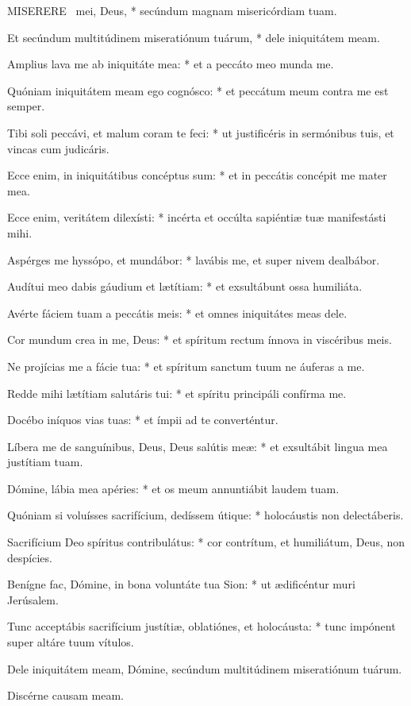 \lettrine[lines=2]{M}{ISERERE} \textdagger\ mei, Deus, * secúndum magnam misericórdiam tuam.

Et secúndum multitúdinem miseratiónum tuárum, * dele iniquitátem meam.

Amplius lava me ab iniquitáte mea: * et a peccáto meo munda me.

Quóniam iniquitátem meam ego cognósco: * et peccátum meum contra me est semper.

Tibi soli peccávi, et malum coram te feci: * ut justificéris in sermónibus tuis, et vincas cum judicáris.

Ecce enim, in iniquitátibus concéptus sum: * et in peccátis concépit me mater mea.

Ecce enim, veritátem dilexísti: * incérta et occúlta sapiéntiæ tuæ manifestásti mihi.

Aspérges me hyssópo, et mundábor: * lavábis me, et super nivem dealbábor.

Audítui meo dabis gáudium et lætítiam: * et exsultábunt ossa humiliáta.

Avérte fáciem tuam a peccátis meis: * et omnes iniquitátes meas dele.

Cor mundum crea in me, Deus: * et spíritum rectum ínnova in viscéribus meis.

Ne projícias me a fácie tua: * et spíritum sanctum tuum ne áuferas a me.

Redde mihi lætítiam salutáris tui: * et spíritu principáli confírma me.

Docébo iníquos vias tuas: * et ímpii ad te converténtur.

Líbera me de sanguínibus, Deus, Deus salútis meæ: * et exsultábit lingua mea justítiam tuam.

Dómine, lábia mea apéries: * et os meum annuntiábit laudem tuam.

Quóniam si voluísses sacrifícium, dedíssem útique: * holocáustis non delectáberis.

Sacrifícium Deo spíritus contribulátus: * cor contrítum, et humiliátum, Deus, non despícies.

Benígne fac, Dómine, in bona voluntáte tua Sion: * ut ædificéntur muri Jerúsalem.

Tunc acceptábis sacrifícium justítiæ, oblatiónes, et holocáusta: * tunc impónent super altáre tuum vítulos.

 Dele iniquitátem meam, Dómine, secúndum multitúdinem miseratiónum tuárum.

 Discérne causam meam.

